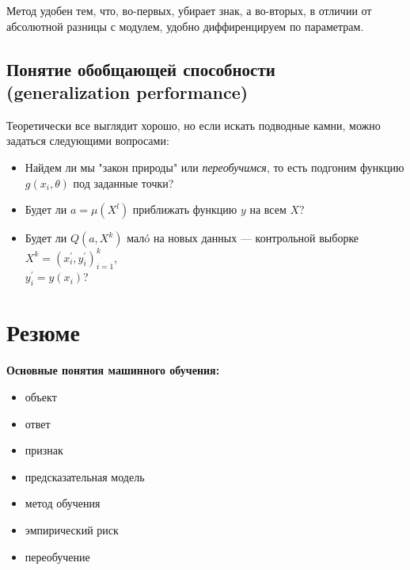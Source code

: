 \documentclass{article}
\begin{document}
Метод удобен тем, что, во-первых, убирает знак, а во-вторых, в отличии от абсолютной разницы с модулем, удобно диффиренцируем по параметрам. 

\subsection{Понятие обобщающей способности (generalization performance)}

Теоретически все выглядит хорошо, но если искать подводные камни, можно задаться следующими вопросами:

\begin{itemize}
\item Найдем ли мы "закон природы" или \textit{переобучимся}, то есть подгоним функцию $g(x_i, \theta)$ под заданные точки?

\item Будет ли $a = \mu(X^l)$ приближать функцию $y$ на всем $X$?

\item Будет ли $Q(a, X^k)$ мал\'o на новых данных ---
контрольной выборке $X^k = (x_i^{'}, y_i^{'})_{i = 1}^k$,\\$y_i^{'} = y(x_i)$?

\end{itemize}

\section{Резюме}

\textbf{Основные понятия машинного обучения:}
\begin{itemize}
\item объект
\item ответ
\item признак
\item предсказательная модель
\item метод обучения
\item эмпирический риск
\item переобучение
\end{itemize}
\end{document}
